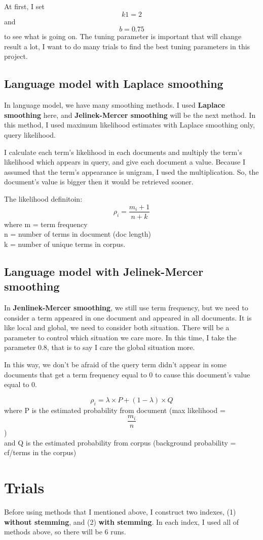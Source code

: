 \documentclass[a4pper,11pt,onecolumn]{article}
\begin{document}
At first, I set$$k1 = 2$$ and \[b = 0.75\] to see what is going on. The tuning parameter is important that will change result a lot, I want to do many trials to find the best tuning parameters in this project. 

\subsection{Language model with Laplace smoothing}
In language model, we have many smoothing methods. I used \textbf{Laplace smoothing} here, and \textbf{Jelinek-Mercer smoothing} will be the next method. In this method, I used maximum likelihood estimates with Laplace smoothing only, query likelihood.

I calculate each term's likelihood in each documents and multiply the term's likelihood which appears in query, and give each document a value. Because I assumed that the term's appearance is unigram, I used the multiplication. So, the document's value is bigger then it would be retrieved sooner.

The likelihood definitoin:
\[
    \rho_i = \frac{m_i + 1}{n + k}
\]
where m = term frequency\\
n = number of terms in document (doc length)\\
k = number of unique terms in corpus.

\subsection{Language model with Jelinek-Mercer smoothing}
In \textbf{Jenlinek-Mercer smoothing}, we still use term frequency, but we  need to consider a term appeared in one document and appeared in all documents. It is like local and global, we need to consider both situation. There will be a parameter to control which situation we care more. In this time, I take the parameter 0.8, that is to say I care the global situation more.

In this way, we don't be afraid of the query term didn't appear in some documents that get a term frequency equal to 0 to cause this document's value equal to 0.

\[
    \rho_i = \lambda \times P + (1 - \lambda) \times Q
\]
where P is the estimated probability from document (max likelihood = \[ \frac{m_i}{n}\])\\
and Q is the estimated probability from corpus (background probability = cf/terms in the corpus)

\section{Trials}
Before using methods that I mentioned above, I construct two indexes, (1) \textbf{without stemming}, and (2) \textbf{with stemming}. In each index, I used all of methods above, so there will be 6 runs.
\end{document}
